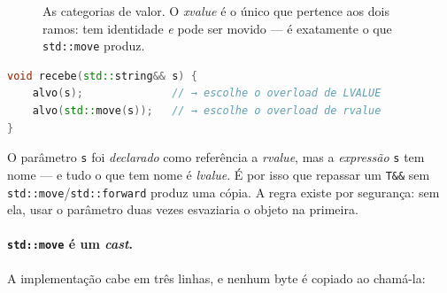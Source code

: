 \begin{figure}[htbp]
\centering
{}
\caption{As categorias de valor. O \emph{xvalue} é o único que pertence aos dois
         ramos: tem identidade \emph{e} pode ser movido --- é exatamente o que
         \texttt{std::move} produz.}
\label{fig:categorias}
\end{figure}

\begin{armadilha}
\begin{lstlisting}[style=bt, language=C++, frame=none,
                   xleftmargin=0pt, xrightmargin=0pt]
void recebe(std::string&& s) {
    alvo(s);              // → escolhe o overload de LVALUE
    alvo(std::move(s));   // → escolhe o overload de rvalue
}
\end{lstlisting}
O parâmetro \texttt{s} foi \emph{declarado} como referência a \emph{rvalue},
mas a \emph{expressão} \texttt{s} tem nome --- e tudo o que tem nome é
\emph{lvalue}. É por isso que repassar um \texttt{T\&\&} sem
\texttt{std::move}/\texttt{std::forward} produz uma cópia. A regra existe por
segurança: sem ela, usar o parâmetro duas vezes esvaziaria o objeto na primeira.
\end{armadilha}

\paragraph{\texttt{std::move} é um \emph{cast}.} A implementação cabe em três
linhas, e nenhum byte é copiado ao chamá-la:

